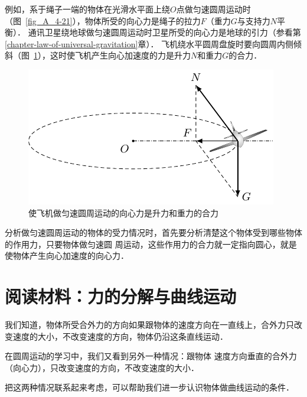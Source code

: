 例如，系于绳子一端的物体在光滑水平面上绕$O$点做匀速圆周运动时（图~\ref{fig_A_4-21}），物体所受的向心力是绳子的拉力$F$（重力$G$与支持力$N$平衡）． 通讯卫星绕地球做匀速圆周运动时卫星所受的向心力是地球的引力（参看第\ref{chapter-law-of-universal-gravitation}章）． 飞机绕水平圆周盘旋时要向圆周内侧倾斜（图~\ref{fig_A_4-22}），这时使飞机产生向心加速度的力是升力$N$和重力$G$的合力．
\begin{figure}[htbp]
    \centering
    \includegraphics{fig/A/4-22.pdf}
    \caption{使飞机做匀速圆周运动的向心力是升力和重力的合力}\label{fig_A_4-22}
\end{figure}

分析做匀速圆周运动的物体的受力情况时，首先要分析清楚这个物体受到哪些物体的作用力，只要物体做匀速圆
周运动，这些作用力的合力就一定指向圆心，就是使物体产生向心加速度的向心力．

\section*{阅读材料：力的分解与曲线运动}
我们知道，物体所受合外力的方向如果跟物体的速度方向在一直线上，合外力只改变速度的大小，不改变速度的方向，物体仍沿这条直线运动．

在圆周运动的学习中，我们又看到另外一种情况：跟物体
速度方向垂直的合外力（向心力），只改变速度的方向，不改变速度的大小．

把这两种情况联系起来考虑，可以帮助我们进一步认识物体做曲线运动的条件．


